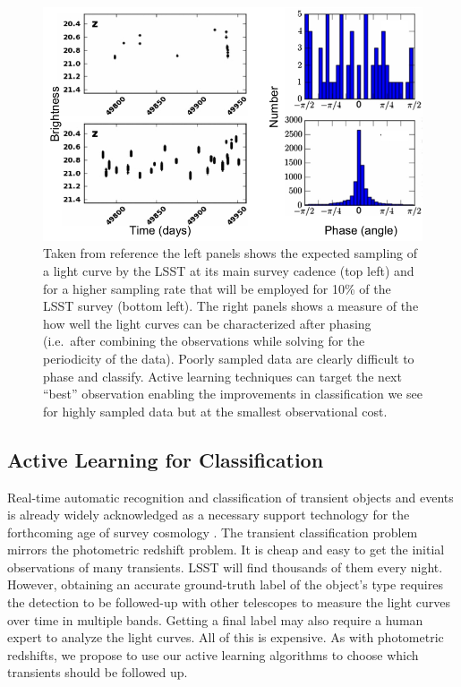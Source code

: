 \documentclass[prd,nofootbib,floatfix,11pt,tightenlines,nofootinbib]{revtex4}
\begin{document}
\begin{figure}[t]
\centerline{
\includegraphics[scale=1.0]{rrlyrae.png}
}
\caption{
Taken from reference \cite{rrlyrae} the left panels shows the expected
sampling of
a light curve by the LSST at its main survey cadence (top left) and
for a higher sampling rate that will be employed for 10\% of the LSST
survey (bottom left). The right panels shows a measure of the  how well
the light curves can be characterized after phasing (i.e.\ after combining the observations while solving
for the periodicity of the data). Poorly sampled data are clearly
difficult to phase and classify. Active learning techniques can target
the next ``best'' observation enabling the improvements in
classification we see for highly sampled data but at the smallest observational cost.}

\label{fig:RRLyrae}
\end{figure}

\subsection{Active Learning for Classification}
\label{sec:transients}

Real-time automatic recognition and classification of transient objects and
events is already widely acknowledged as a necessary support technology for
the forthcoming age of survey cosmology
\cite{djorgovski2011,richards2011,richards2012,graham2012,mahabal2008a,mahabal2011a}.
The transient classification problem mirrors the photometric redshift
problem.  It is cheap and easy to get the initial observations of many
transients.  LSST will find thousands of them every night.  However,
obtaining an accurate ground-truth label of the object's type requires the
detection to be followed-up with other telescopes to measure the light
curves over time in multiple bands.  Getting a final label may also require
a human expert to analyze the light curves.  All of this is expensive.  As
with photometric redshifts, we propose to use our active learning
algorithms to choose which transients should be followed up.  
\end{document}
